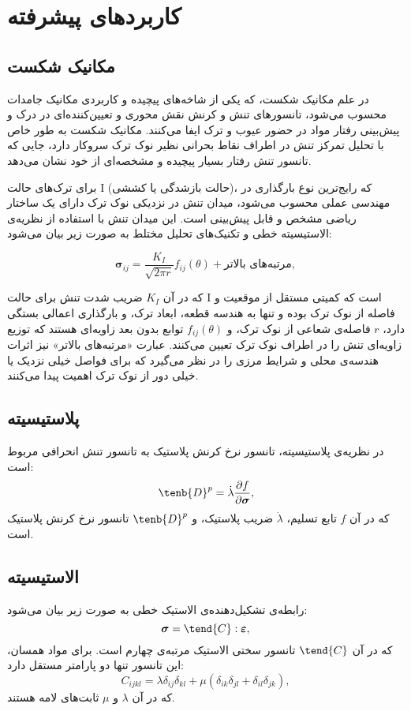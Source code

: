 \section{کاربردهای پیشرفته}

\subsection{مکانیک شکست}
در علم مکانیک شکست، که یکی از شاخه‌های پیچیده و کاربردی مکانیک جامدات محسوب می‌شود، تانسورهای تنش و کرنش نقش محوری و تعیین‌کننده‌ای در درک و پیش‌بینی رفتار مواد در حضور عیوب و ترک ایفا می‌کنند. مکانیک شکست به طور خاص با تحلیل تمرکز تنش در اطراف نقاط بحرانی نظیر نوک ترک سروکار دارد، جایی که تانسور تنش رفتار بسیار پیچیده و مشخصه‌ای از خود نشان می‌دهد.

برای ترک‌های حالت I (حالت بازشدگی یا کششی)، که رایج‌ترین نوع بارگذاری در مهندسی عملی محسوب می‌شود، میدان تنش در نزدیکی نوک ترک دارای یک ساختار ریاضی مشخص و قابل پیش‌بینی است. این میدان تنش با استفاده از نظریه‌ی الاستیسیته خطی و تکنیک‌های تحلیل مختلط به صورت زیر بیان می‌شود:

\begin{equation}
    \boldsymbol{\sigma}_{ij} = \frac{K_I}{\sqrt{2\pi r}} f_{ij}(\theta) + \text{مرتبه‌های بالاتر},
\end{equation}

که در آن $K_I$ ضریب شدت تنش برای حالت I است که کمیتی مستقل از موقعیت و فاصله از نوک ترک بوده و تنها به هندسه قطعه، ابعاد ترک، و بارگذاری اعمالی بستگی دارد، $r$ فاصله‌ی شعاعی از نوک ترک، و $f_{ij}(\theta)$ توابع بدون بعد زاویه‌ای هستند که توزیع زاویه‌ای تنش را در اطراف نوک ترک تعیین می‌کنند. عبارت «مرتبه‌های بالاتر» نیز اثرات هندسه‌ی محلی و شرایط مرزی را در نظر می‌گیرد که برای فواصل خیلی نزدیک یا خیلی دور از نوک ترک اهمیت پیدا می‌کنند.

\subsection{پلاستیسیته}
در نظریه‌ی پلاستیسیته، تانسور نرخ کرنش پلاستیک به تانسور تنش انحرافی مربوط است:
\begin{equation}
    \tenb{D}^p = \dot{\lambda} \frac{\partial f}{\partial \boldsymbol{\sigma}},
\end{equation}
که در آن $f$ تابع تسلیم، $\dot{\lambda}$ ضریب پلاستیک، و $\tenb{D}^p$ تانسور نرخ کرنش پلاستیک است.

\subsection{الاستیسیته}
رابطه‌ی تشکیل‌دهنده‌ی الاستیک خطی به صورت زیر بیان می‌شود:
\begin{equation}
    \boldsymbol{\sigma} = \tend{C} : \boldsymbol{\varepsilon},
\end{equation}
که در آن $\tend{C}$ تانسور سختی الاستیک مرتبه‌ی چهارم است. برای مواد همسان، این تانسور تنها دو پارامتر مستقل دارد:
\begin{equation}
    C_{ijkl} = \lambda \delta_{ij} \delta_{kl} + \mu (\delta_{ik} \delta_{jl} + \delta_{il} \delta_{jk}),
\end{equation}
که در آن $\lambda$ و $\mu$ ثابت‌های لامه هستند.

